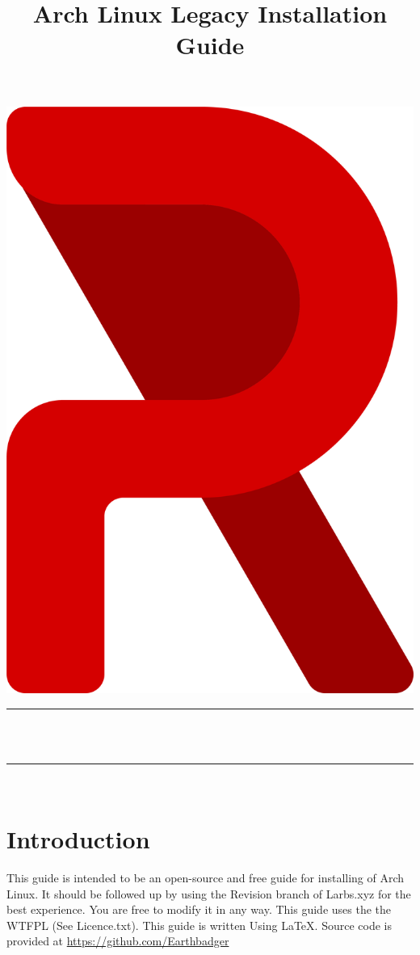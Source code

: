 \documentclass[titlepage]{article}
\title{Arch Linux Legacy Installation Guide} %
\makeatletter
\let\thetitle\@title
\makeatother
\begin{document}

\begin{titlepage}
    \centering
    \vspace*{0.5 cm}
    \includegraphics[scale = 0.2]{logo.png}\\	%
	\rule{\linewidth}{0.2 mm} \\[0.5 cm]
	{ \huge \bfseries \thetitle}\\
	\rule{\linewidth}{0.2 mm} \\[1.5 cm]
	  
\end{titlepage}

\section*{Introduction}
This guide is intended to be an open-source and free guide for installing of Arch Linux. It should be followed up by using the Revision branch of Larbs.xyz for the best experience. You are free to modify it in any way.
This guide uses the the WTFPL (See Licence.txt). This guide is written Using {\LaTeX}. Source code is provided at \url{https://github.com/Earthbadger}
\end{document}
